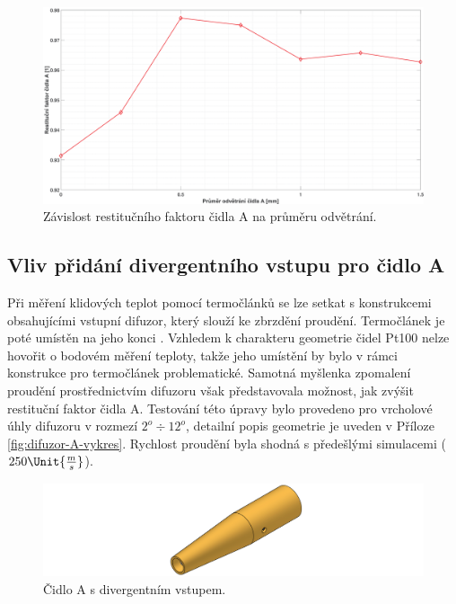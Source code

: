         \begin{figure}[ht!]
            \centering
            \includegraphics*[width=\textwidth]{400_SIMULACE_KONSTRUKCNICH_UPRAV/Grafy/07_prumer_odvetrani_A.eps}
            \caption{Závislost restitučního faktoru čidla A na průměru odvětrání.}
            \label{fig:prumer-odvetrani-A}
        \end{figure}
    
    \newpage
    \subsection{Vliv přidání divergentního vstupu pro čidlo A}
        Při měření klidových teplot pomocí termočlánků se lze setkat s konstrukcemi obsahujícími vstupní difuzor, který slouží ke zbrzdění proudění. Termočlánek je poté umístěn na jeho konci \cite{Shapiro1954}. Vzhledem k charakteru geometrie čidel Pt100 nelze hovořit o bodovém měření teploty, takže jeho umístění by bylo v rámci konstrukce pro termočlánek problematické. Samotná myšlenka zpomalení proudění prostřednictvím difuzoru však představovala možnost, jak zvýšit restituční faktor čidla A. Testování této úpravy bylo provedeno pro vrcholové úhly difuzoru v rozmezí $2^o \div 12^o$, detailní popis geometrie je uveden v Příloze \ref{fig:difuzor-A-vykres}. Rychlost proudění byla shodná s předešlými simulacemi ($250 \Unit{\frac{m}{s}}$).
        
        \begin{figure}[ht!]
            \centering
            \includegraphics[width=\textwidth]{400_SIMULACE_KONSTRUKCNICH_UPRAV/Vykresy_rendery/Difuzor_A.png}
            \caption{Čidlo A s divergentním vstupem.}
            \label{fig:difuzor-A}
        \end{figure}

